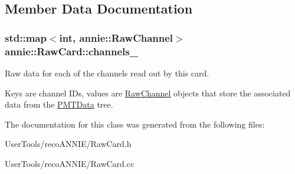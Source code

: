 \subsection{Member Data Documentation}
\hypertarget{classannie_1_1RawCard_a2511d83c56ea8107a92c27bf4c9d662b}{
\subsubsection[{channels\-\_\-}]{\setlength{\rightskip}{0pt plus 5cm}std\-::map$<$int, {\bf annie\-::\-Raw\-Channel}$>$ annie\-::\-Raw\-Card\-::channels\-\_\-\hspace{0.3cm}{\ttfamily [protected]}}}\label{classannie_1_1RawCard_a2511d83c56ea8107a92c27bf4c9d662b}


Raw data for each of the channels read out by this card. 

Keys are channel I\-Ds, values are \hyperlink{classannie_1_1RawChannel}{Raw\-Channel} objects that store the associated data from the \hyperlink{classPMTData}{P\-M\-T\-Data} tree. 

The documentation for this class was generated from the following files\-:\begin{DoxyCompactItemize}
\item 
User\-Tools/reco\-A\-N\-N\-I\-E/Raw\-Card.\-h\item 
User\-Tools/reco\-A\-N\-N\-I\-E/Raw\-Card.\-cc\end{DoxyCompactItemize}
